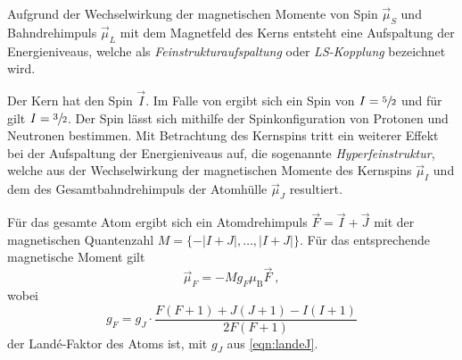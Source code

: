     Aufgrund der Wechselwirkung der magnetischen Momente von Spin $\vec{\mu}_S$ und Bahndrehimpuls $\vec{\mu}_L$ mit dem Magnetfeld des Kerns entsteht eine Aufspaltung der Energieniveaus,
    welche als \textit{Feinstrukturaufspaltung} oder \textit{LS-Kopplung} bezeichnet wird.

    Der Kern hat den Spin $\vec{I}$.
    Im Falle von  ergibt sich ein Spin von $I = \sfrac{5}{2}$ und für  gilt $I = \sfrac{3}{2}$.
    Der Spin lässt sich mithilfe der Spinkonfiguration von Protonen und Neutronen bestimmen.
    Mit Betrachtung des Kernspins tritt ein weiterer Effekt bei der Aufspaltung der Energieniveaus auf,
    die sogenannte \textit{Hyperfeinstruktur},
    welche aus der Wechselwirkung der magnetischen Momente des Kernspins $\vec{\mu}_I$ und dem des Gesamtbahndrehimpuls der Atomhülle $\vec{\mu}_J$ resultiert.

    Für das gesamte Atom ergibt sich ein Atomdrehimpuls $\vec{F} = \vec{I} + \vec{J}$ mit der magnetischen Quantenzahl $M = \{-\lvert I+J \rvert, \ldots, \lvert I+J \rvert\}$.
    Für das entsprechende magnetische Moment gilt
    \begin{equation*}
        \vec{\mu}_F = - M g_F \mu_\text{B} \vec{F} \ ,
    \end{equation*}
    wobei
    \begin{equation}
        g_F = g_J \cdot \frac{F(F+1) + J(J+1) - I(I+1)}{2F(F+1)}
        \label{eqn:landeF}
    \end{equation}
    der Landé-Faktor des Atoms ist,
    mit $g_J$ aus \autoref{eqn:landeJ}.

